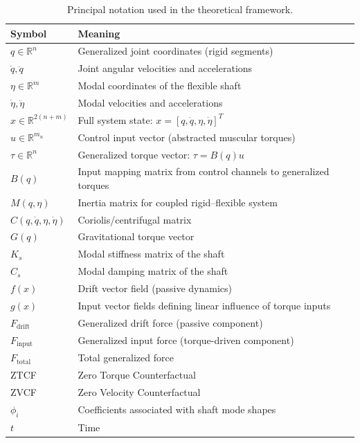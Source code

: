 \documentclass[12pt]{article}
\newcommand{\R}{\mathbb{R}}
\newcommand{\qd}{\dot{q}}
\newcommand{\qdd}{\ddot{q}}
\newcommand{\etad}{\dot{\eta}}
\newcommand{\etadd}{\ddot{\eta}}
\begin{document}
\begin{table}[h]
  \centering
  \caption{Principal notation used in the theoretical framework.}
  \label{tab:notation}
  \begin{tabular}{ll}
    \toprule
    Symbol & Meaning \\
    \midrule
    \(q \in \R^{n}\) & Generalized joint coordinates (rigid segments) \\
    \(\qd, \qdd\) & Joint angular velocities and accelerations \\
    \(\eta \in \R^{m}\) & Modal coordinates of the flexible shaft \\
    \(\etad, \etadd\) & Modal velocities and accelerations \\
    \(x \in \R^{2(n+m)}\) & Full system state: \(x = [q,\qd,\eta,\etad]^{T}\) \\
    \(u \in \R^{m_{u}}\) & Control input vector (abstracted muscular torques) \\
    \(\tau \in \R^{n}\) & Generalized torque vector: \(\tau = B(q) u\) \\
    \(B(q)\) & Input mapping matrix from control channels to generalized torques \\
    \(M(q,\eta)\) & Inertia matrix for coupled rigid--flexible system \\
    \(C(q,\qd,\eta,\etad)\) & Coriolis/centrifugal matrix \\
    \(G(q)\) & Gravitational torque vector \\
    \(K_{s}\) & Modal stiffness matrix of the shaft \\
    \(C_{s}\) & Modal damping matrix of the shaft \\
    \(f(x)\) & Drift vector field (passive dynamics) \\
    \(g(x)\) & Input vector fields defining linear influence of torque inputs \\
    \(F_{\text{drift}}\) & Generalized drift force (passive component) \\
    \(F_{\text{input}}\) & Generalized input force (torque-driven component) \\
    \(F_{\text{total}}\) & Total generalized force \\
    ZTCF & Zero Torque Counterfactual \\
    ZVCF & Zero Velocity Counterfactual \\
    \(\phi_{i}\) & Coefficients associated with shaft mode shapes \\
    \(t\) & Time \\
    \bottomrule
  \end{tabular}
\end{table}
\end{document}

